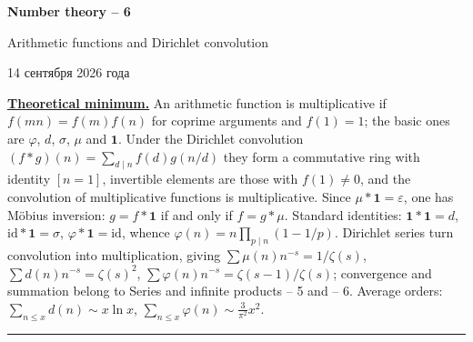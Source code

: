 \documentclass[11pt,a4paper]{article}
\renewcommand{\le}{\leqslant}
\newcommand{\head}[1]{\par\medskip\noindent\textbf{\underline{#1}}\quad}
\newcommand{\sheettitle}[4]{%
  \begin{center}
  {\huge\bfseries #1\par}\vspace{1.2em}
  {\Large #2\par}\vspace{0.8em}
  \if\relax\detokenize{#3}\relax\else{\Large #3\par}\vspace{0.8em}\fi
  {\foreignlanguage{russian}{#4}\par}
  \end{center}\vspace{0.5em}}
\begin{document}
\sheettitle{Number theory -- 6}{Arithmetic functions and Dirichlet convolution}{Homework}{14 сентября 2026 года}

\head{Theoretical minimum.} An arithmetic function is multiplicative if $f(mn)=f(m)f(n)$ for
coprime arguments and $f(1)=1$; the basic ones are $\varphi$, $d$, $\sigma$, $\mu$ and
$\mathbf 1$. Under the Dirichlet convolution $(f*g)(n)=\sum_{d\mid n}f(d)g(n/d)$ they form a
commutative ring with identity $[n=1]$, invertible elements are those with $f(1)\ne0$, and the
convolution of multiplicative functions is multiplicative. Since $\mu{*}\mathbf 1=\varepsilon$, one
has M\"obius inversion: $g=f*\mathbf 1$ if and only if $f=g*\mu$. Standard identities:
$\mathbf 1{*}\mathbf 1=d$, $\mathrm{id}{*}\mathbf 1=\sigma$, $\varphi{*}\mathbf 1=\mathrm{id}$, whence
$\varphi(n)=n\prod_{p\mid n}(1-1/p)$. Dirichlet series turn convolution into multiplication, giving
$\sum\mu(n)n^{-s}=1/\zeta(s)$, $\sum d(n)n^{-s}=\zeta(s)^2$, $\sum\varphi(n)n^{-s}=\zeta(s-1)/\zeta(s)$;
convergence and summation belong to Series and infinite products -- 5 and -- 6. Average orders:
$\sum_{n\le x}d(n)\sim x\ln x$, $\sum_{n\le x}\varphi(n)\sim\frac3{\pi^2}x^2$.

\medskip\noindent\rule{\linewidth}{0.4pt}
\end{document}
